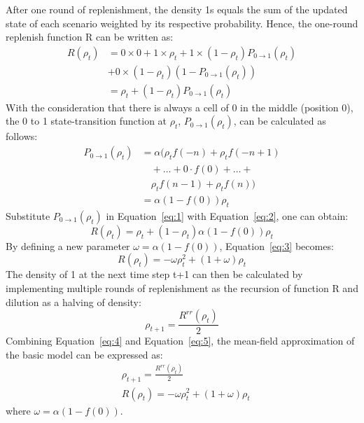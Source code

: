 After one round of replenishment, the density 1s equals the sum of the updated state of each scenario weighted by its respective probability. Hence, the one-round replenish function R can be written as:
\begin{equation}\label{eq:1}
\begin{split}
                R(\rho_{t})
                &= 0 \times 0 + 1 \times \rho_{t} + 1 \times (1 - \rho_{t})P_{0\rightarrow 1}(\rho_{t}) \\
                & + 0 \times (1 - \rho_{t})(1 - P_{0\rightarrow 1}(\rho_{t})) \\
                &=\rho_{t} + (1 - \rho_{t})P_{0\rightarrow 1}(\rho_{t})
\end{split}
\end{equation}
With the consideration that there is always a cell of 0 in the middle (position 0), the 0 to 1 state-transition function at $\rho_{t}$, $P_{0\rightarrow 1}(\rho_{t})$, can be calculated as follows: 
\begin{equation}\label{eq:2}
\begin{split}
                P_{0\rightarrow 1}(\rho_{t})
                &=\alpha(\rho_{t}f(-n)+\rho_{t}f(-n+1)\\
                &\quad+\ldots+0\cdot f(0)+\ldots+\\
                &\quad \rho_{t}f(n-1)+\rho_{t}f(n))\\
                &=\alpha(1-f(0))\rho_{t}
\end{split}
\end{equation}
Substitute $P_{0\rightarrow 1}(\rho_{t})$ in Equation~\ref{eq:1} with Equation~\ref{eq:2}, one can obtain:
\begin{equation}\label{eq:3}
                R(\rho_{t}) = \rho_{t} + (1 - \rho_{t})\alpha(1 - f(0))\rho_{t}
\end{equation}
By defining a new parameter $\omega = \alpha(1 - f(0))$, Equation~\ref{eq:3} becomes:
\begin{equation}\label{eq:4}
                R(\rho_{t}) = -\omega \rho_{t}^{2} + (1 + \omega) \rho_{t}
\end{equation}
The density of 1 at the next time step t+1 can then be calculated by implementing multiple rounds of replenishment as the recursion of function R and dilution as a halving of density:
\begin{equation}\label{eq:5}
                \rho_{t+1} = \frac{R^{rr}(\rho_{t})}{2}
\end{equation}
Combining Equation~\ref{eq:4} and Equation~\ref{eq:5}, the mean-field approximation of the basic model can be expressed as:
\begin{equation}\label{eq:6}
\begin{split}
            &\rho_{t+1} = \frac{R^{rr}(\rho_{t})}{2} \\
            &R(\rho_{t}) = -\omega \rho_{t}^{2} + (1 + \omega) \rho_{t}
\end{split}
\end{equation}
where $\omega = \alpha(1 - f(0))$. 

